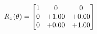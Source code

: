 \documentclass[preview]{standalone}
\begin{document}
\begin{align*}
\special{dvisvgm:raw <g id='unique000'>}R_{x}(\theta) = \begin{bmatrix}1 & 0 & 0 \\0 & +1.00 & +0.00 \\0 & +0.00 & +1.00\end{bmatrix}\special{dvisvgm:raw </g>}
\end{align*}
\end{document}
